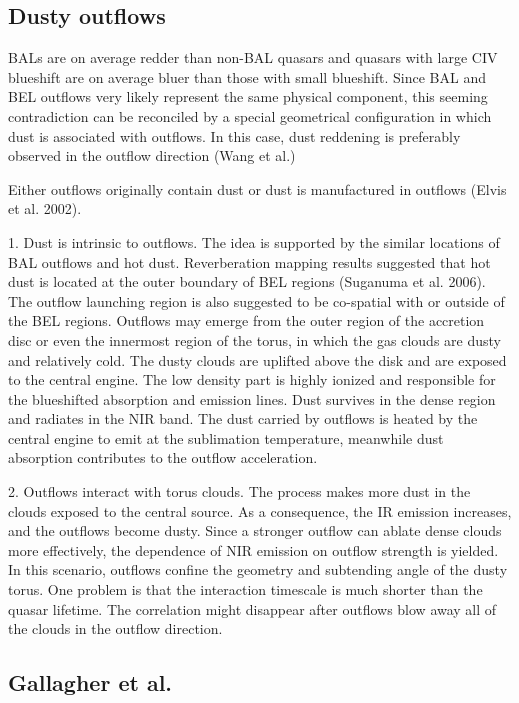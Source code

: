 \subsection{Dusty outflows}

BALs are on average redder than non-BAL quasars and quasars with large CIV blueshift are on average bluer than those with small blueshift. 
Since BAL and BEL outflows very likely represent the same physical component, this seeming contradiction can be reconciled by a special geometrical configuration in which dust is associated with outflows. 
In this case, dust reddening is preferably observed in the outflow direction (Wang et al.) 

Either outflows originally contain dust or dust is manufactured in outflows (Elvis et al. 2002). 

1. Dust is intrinsic to outflows. 
The idea is supported by the similar locations of BAL outflows and hot dust. 
Reverberation mapping results suggested that hot dust is located at the outer boundary of BEL regions (Suganuma et al. 2006). 
The outflow launching region is also suggested to be co-spatial with or outside of the BEL regions. 
Outflows may emerge from the outer region of the accretion disc or even the innermost region of the torus, in which the gas clouds are dusty and relatively cold. 
The dusty clouds are uplifted above the disk and are exposed to the central engine. 
The low density part is highly ionized and responsible for the blueshifted absorption and emission lines. 
Dust survives in the dense region and radiates in the NIR band. 
The dust carried by outflows is heated by the central engine to emit at the sublimation temperature, meanwhile dust absorption contributes to the outflow acceleration. 

2. Outflows interact with torus clouds. 
The process makes more dust in the clouds exposed to the central source. 
As a consequence, the IR emission increases, and the outflows become dusty. 
Since a stronger outflow can ablate dense clouds more effectively, the dependence of NIR emission on outflow strength is yielded. 
In this scenario, outflows confine the geometry and subtending angle of the dusty torus. 
One problem is that the interaction timescale is much shorter than the quasar lifetime. 
The correlation might disappear after outflows blow away all of the clouds in the outflow direction. 

\subsection{Gallagher et al.}

